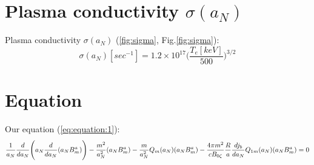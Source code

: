 \documentclass[11pt,oneside,a4paper,notitlepage]{article}
\begin{document}
\section{Plasma conductivity $\sigma(a_N)$}
Plasma conductivity $\sigma(a_N)$ (\ref{fig:sigma}, Fig.\ref{fig:sigma}):
\begin{equation}
 \sigma(a_N)[sec^{-1}]=1.2\times10^{17}\Bigg(\dfrac{T_e[keV]}{500}\Bigg)^{3/2}
\end{equation}

\section{Equation}
Our equation (\ref{eq:equation:1}):
\begin{equation} \label{eq:equation:1}
\frac{1}{a_N}\frac{d}{da_N}\Bigg( a_N \frac{d}{da_N}(a_NB_m^a) \Bigg) \\
-\frac{m^2}{a_N^2}(a_NB_m^a)-\frac{m}{a_N^2}Q_m(a_N)(a_NB_m^a)- \\
\frac{4\pi m^2}{cB_{0\zeta}}\frac{R}{a}\frac{dj_b}{da_N}Q_{1m}(a_N)(a_NB_m^a)=0
\end{equation}
\end{document}
